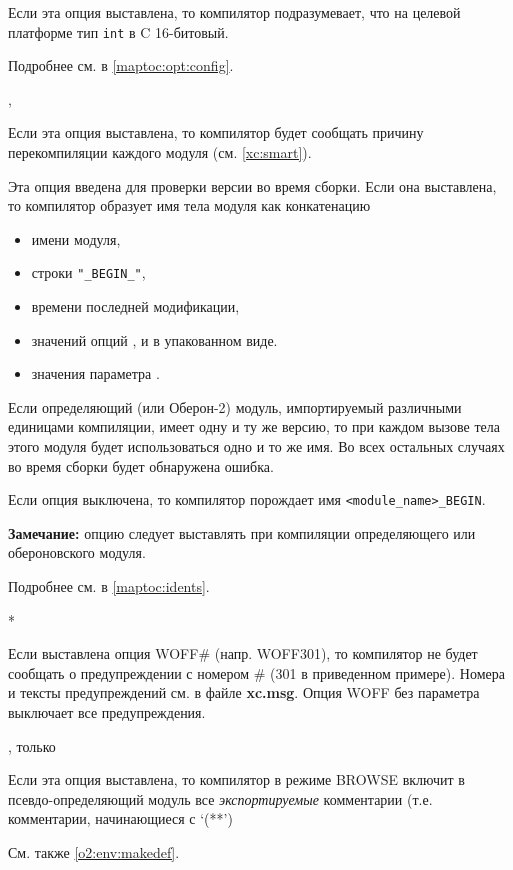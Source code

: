 \begin{description}
\ifgenc
{}
        \MLBegin{}\ModeC{}\MLEnd{}

Если эта опция выставлена, то компилятор подразумевает, что
на целевой платформе тип {\tt int} в C 16-битовый.

Подробнее см. в \ref{maptoc:opt:config}.
\fi

        \MLBegin{}\ModeM{},\ModeP{}\MLEnd{}

Если эта опция выставлена, то компилятор будет сообщать причину
перекомпиляции каждого модуля (см. \ref{xc:smart}).

        \MLBegin{}\ModeC{}\MLEnd{}

Эта опция введена для проверки версии во время сборки.
Если она выставлена, то компилятор образует имя тела модуля как
конкатенацию
        \begin{itemize}
        \item имени модуля,
        \item строки \verb+"_BEGIN_"+,
        \item времени последней модификации,
\ifgenc
        \item значений опций ,  и
         в упакованном виде.
\fi
\ifgencode
        \item значения параметра . %
\fi
        \end{itemize}
Если определяющий (или Оберон-2) модуль, импортируемый
различными единицами компиляции, имеет одну и ту же версию, то
при каждом вызове тела этого модуля будет использоваться одно и
то же имя. Во всех остальных случаях во время сборки будет
обнаружена ошибка.

Если опция выключена, то компилятор порождает имя 
\verb|<module_name>_BEGIN|.

{\bf Замечание:} опцию следует выставлять при компиляции определяющего
или обероновского модуля.

\ifgenc
Подробнее см. в \ref{maptoc:idents}.
\fi

        \MLBegin{}*\MLEnd{}  \inline

Если выставлена опция WOFF\# (напр. WOFF301),
то компилятор не будет сообщать о предупреждении с номером
\# (301 в приведенном примере).
Номера и тексты предупреждений см. в файле {\bf xc.msg}.
Опция WOFF без параметра выключает все предупреждения.

        \MLBegin{}\ModeC{}, только \ot{}\MLEnd{}

Если эта опция выставлена, то компилятор в режиме BROWSE
включит в псевдо-определяющий модуль все
{\em экспортируемые} комментарии
(т.е. комментарии, начинающиеся с `(**')

См. также \ref{o2:env:makedef}.

\ifonline \else
\end{description}
\fi

